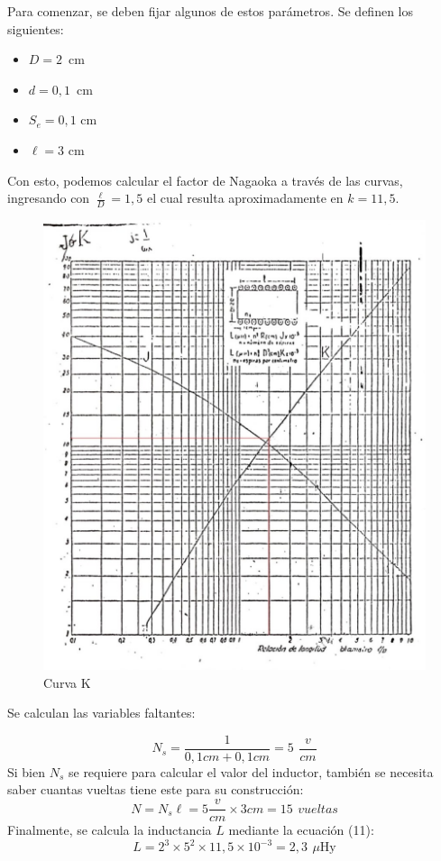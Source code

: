 Para comenzar, se deben fijar algunos de estos parámetros. Se definen los siguientes:
\begin{itemize}
    \item \( D = 2 \, \) cm 
    \item \( d = 0,1 \, \) cm 
    \item \( S_e = 0,1 \) cm
\item \( \ell = 3 \) cm
\end{itemize}
Con esto, podemos calcular el factor de Nagaoka a través de las curvas, ingresando con \(\frac{\ell}{D}=1,5\) el cual resulta aproximadamente en \(k = 11,5\).
\newpage
\begin{figure}[!h]
    \centering
    \includegraphics[scale=0.2]{Imagenes/CURVAK.jpeg}
    \caption{Curva K}
    \label{fig:K}
\end{figure}

Se calculan las variables faltantes:

\begin{equation}
    N_s =\frac{1}{0,1cm+0,1cm} = 5 \,\ \frac{v}{cm}
\end{equation}
Si bien \(N_s\) se requiere para calcular el valor del inductor, también se necesita saber cuantas vueltas tiene este para su construcción:
\begin{equation}
    N = N_s \ell = 5\frac{v}{cm}\times3cm = 15 \,\ vueltas
\end{equation}
Finalmente, se calcula la inductancia \(L\) mediante la ecuación (11):
\begin{equation}
    L = 2^3 \times 5^2 \times 11,5 \times 10^{-3} = 2,3\,\ \mu \text{Hy}
\end{equation}


